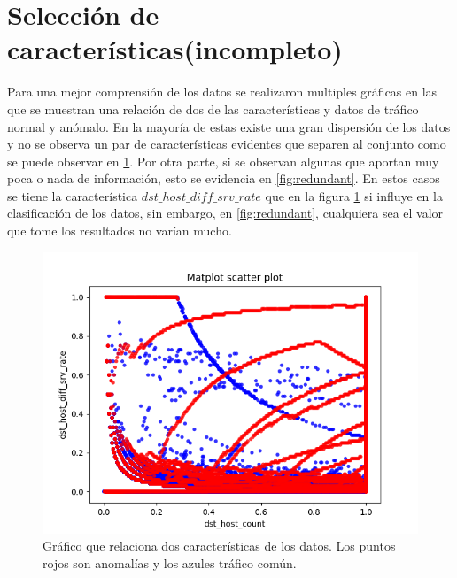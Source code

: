 \section{Selección de características(incompleto)}

Para una mejor comprensión de los datos se realizaron multiples gráficas en las que se muestran una relación de dos de las características y datos de tráfico normal y anómalo. En la mayoría de estas existe una gran dispersión de los datos y no se observa un par de características evidentes que separen al conjunto como se puede observar en \ref{fig:entropy}. Por otra parte, si se observan algunas que aportan muy poca o nada de información, esto se evidencia en \ref{fig:redundant}. En estos casos se tiene la característica $dst\_host\_diff\_srv\_rate$ que en la figura \ref{fig:entropy} si influye en la clasificación de los datos, sin embargo, en \ref{fig:redundant}, cualquiera sea el valor que tome los resultados no varían mucho.

\begin{figure}[b]
    \includegraphics[width=\linewidth]{Images/dst_host_count-dst_host_diff_srv_rate.png}
    \caption{Gráfico que relaciona dos características de los datos. Los puntos rojos son anomalías y los azules tráfico común.}
    \label{fig:entropy}
\end{figure}

